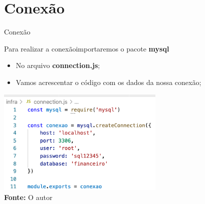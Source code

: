 \documentclass{beamer}
\begin{document}
\section{Conexão}
    \begin{frame}[label=lists]{Conexão}

         Para realizar a conexãoimportaremos o pacote \textbf{mysql}
         \begin{itemize}
         \item No arquivo \textbf{connection.js};
         \item Vamos acrescentar o código com os dados da nossa conexão;
         \end{itemize}
	            \includegraphics[width=80mm]{resources/aula6_3.png}\\
            \tiny{\textbf{Fonte:} O autor}
    \end{frame}
\end{document}
